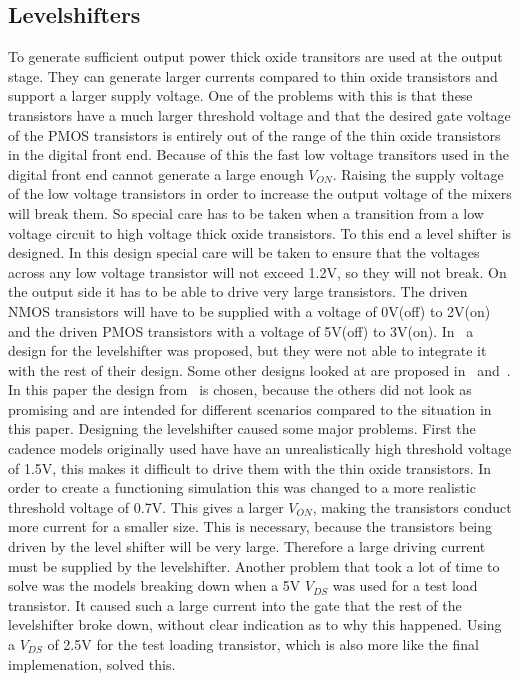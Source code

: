 \makeatletter
\newcommand*{\textoverline}[1]{$\overline{\hbox{#1}}\m@th$}
\makeatother

\subsection{Levelshifters}\label{sec:levelshifter}
To generate sufficient output power thick oxide transitors are used at the output stage. They can generate larger currents compared to thin oxide transistors and support a larger supply voltage. One of the problems with this is that these transistors have a much larger threshold voltage and that the desired gate voltage of the PMOS transistors is entirely out of the range of the thin oxide transistors in the digital front end. Because of this the fast low voltage transitors used in the digital front end cannot generate a large enough $V_{ON}$. Raising the supply voltage of the low voltage transistors in order to increase the output voltage of the mixers will break them. So special care has to be taken when a transition from a low voltage circuit to high voltage thick oxide transistors. To this end a level shifter is designed. In this design special care will be taken to ensure that the voltages across any low voltage transistor will not exceed 1.2V, so they will not break. On the output side it has to be able to drive very large transistors. The driven NMOS transistors will have to be supplied with a voltage of 0V(off) to 2V(on) and the driven PMOS transistors with a voltage of 5V(off) to 3V(on). 
In~\cite{powerdac} a design for the levelshifter was proposed, but they were not able to integrate it with the rest of their design. Some other designs looked at are proposed in~\cite{koo2005new} and~\cite{hass2000level}. In this paper the design from~\cite{powerdac} is chosen, because the others did not look as promising and are intended for different scenarios compared to the situation in this paper. Designing the levelshifter caused some major problems. First the cadence models originally used have have an unrealistically high threshold voltage of 1.5V, this makes it difficult to drive them with the thin oxide transistors. In order to create a functioning simulation this was changed to a more realistic threshold voltage of 0.7V. This gives a larger $V_{ON}$, making the transistors conduct more current for a smaller size. This is necessary, because the transistors being driven by the level shifter will be very large. Therefore a large driving current must be supplied by the levelshifter. Another problem that took a lot of time to solve was the models breaking down when a 5V $V_{DS}$ was used for a test load transistor. It caused such a large current into the gate that the rest of the levelshifter broke down, without clear indication as to why this happened. Using a $V_{DS}$ of 2.5V for the test loading transistor, which is also more like the final implemenation, solved this. 
